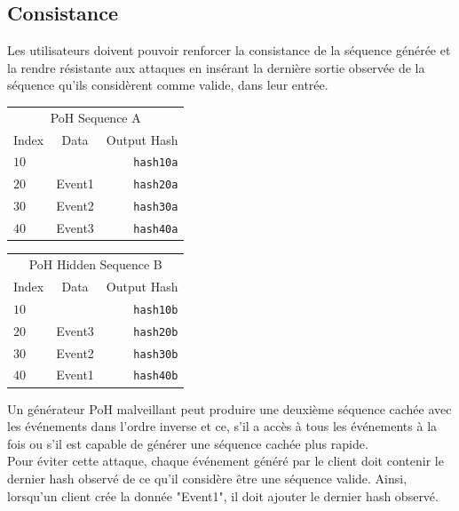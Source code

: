 \documentclass[12pt]{article}
\begin{document}
\subsection{Consistance}
Les utilisateurs doivent pouvoir renforcer la consistance de la séquence générée et la rendre résistante aux attaques en insérant la dernière sortie observée de la séquence qu'ils considèrent comme valide, dans leur entrée.\\

\begin{center}
  \begin{tabular}{ | l c r |}
    \hline
    \multicolumn{3}{|c|}{PoH Sequence A} \\
    Index & Data & Output Hash  \\ \hline
    $10$ & & \texttt{hash10a} \\
    $20$ & Event1 & \texttt{hash20a} \\
    $30$ & Event2 & \texttt{hash30a} \\
    $40$ & Event3 & \texttt{hash40a} \\
    \hline
    \end{tabular}
  \begin{tabular}{ | l c r |}
    \hline
    \multicolumn{3}{|c|}{PoH Hidden Sequence B} \\
    Index & Data & Output Hash \\ \hline
    $10$ & & \texttt{hash10b}\\
    $20$ & Event3 & \texttt{hash20b}  \\
    $30$ & Event2 & \texttt{hash30b} \\
    $40$ & Event1 & \texttt{hash40b} \\
    \hline
    \end{tabular}
\end{center}

Un générateur PoH malveillant peut produire une deuxième séquence cachée avec les événements dans l'ordre inverse et ce, s’il a accès à tous les événements à la fois ou s’il est capable de générer une séquence cachée plus rapide.\\

Pour éviter cette attaque, chaque événement généré par le client doit contenir le dernier hash observé de ce qu'il considère être une séquence valide. Ainsi, lorsqu'un client crée la donnée "Event1", il doit ajouter le dernier hash observé.\\
\end{document}
